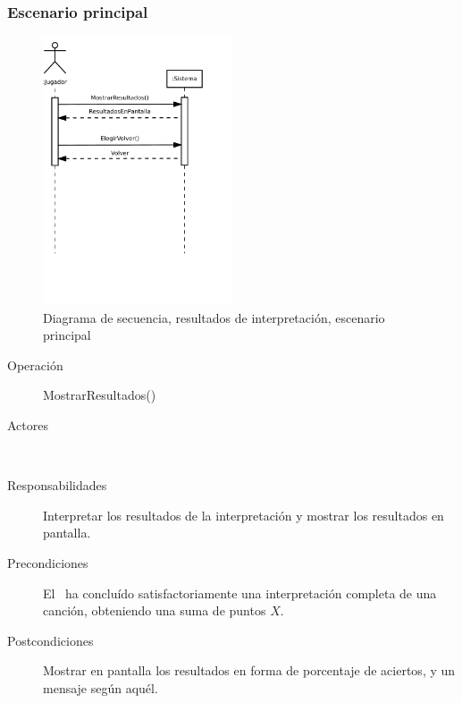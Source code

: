 \subsubsection{Escenario principal}
\begin{figure}[h!]
  \centering
  \includegraphics[trim=0cm 12cm 0cm 0cm, clip=true, width=0.5\textwidth]{4_analisis/diagsec_caso4}
  \caption{Diagrama de secuencia, resultados de interpretación, escenario principal}
\end{figure}

\begin{description}
\item[Operación] MostrarResultados()
\item[Actores] \jugador\, \sistema\
\item[Responsabilidades] Interpretar los resultados de la interpretación y
  mostrar los resultados en pantalla.
\item[Precondiciones] El \jugador\ ha concluído satisfactoriamente una
  interpretación completa de una canción, obteniendo una suma de puntos $X$.
\item[Postcondiciones] Mostrar en pantalla los resultados en forma de porcentaje
  de aciertos, y un mensaje según aquél.
\end{description}

